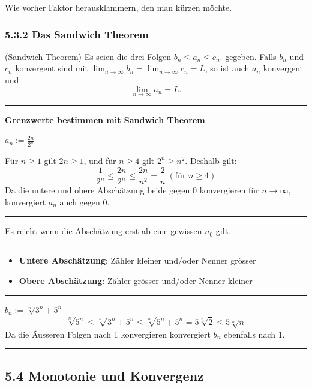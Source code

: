 \documentclass[a4paper,landscape,8pt]{extarticle}
\newcommand{\sep}{\vspace{5pt}\noindent\hrule\vspace{5pt}}
\begin{document}
\begin{multicols*}{4}
\Trick Wie vorher Faktor herausklammern, den man kürzen möchte.

\subsubsection{5.3.2 Das Sandwich Theorem}

\Satz (Sandwich Theorem) Es seien die drei Folgen $b_n \leq a_n \leq c_n$.
gegeben. Falls $b_n$ und $c_n$ konvergent sind mit $\lim_{n\to\infty} b_n =
\lim_{n\to\infty} c_n = L$, so ist auch $a_n$ konvergent und
\[
\lim_{n\to\infty} a_n = L.
\]

\begin{warmup}
\sep

\textbf{Grenzwerte bestimmen mit Sandwich Theorem}

\Bsp $a_n:= \frac{2n}{2^n}$

Für $n\geq 1$ gilt $2n \geq 1$, und für $n\geq 4$ gilt $2^n\geq n^2$. Deshalb
gilt:
\[
\frac{1}{2^n} \leq \frac{2n}{2^n} \leq \frac{2n}{n^2} = \frac{2}{n}  \
(\text{für }n\geq 4)
\]
Da die untere und obere Abschätzung beide gegen 0 konvergieren für $n\to\infty$,
konvergiert $a_n$ auch gegen 0.

\sep
\end{warmup}

\Trick Es reicht wenn die Abschätzung erst ab eine gewissen $n_0$ gilt.

\begin{warmup}
\sep
\end{warmup}

\Trick \begin{itemize}
  \item \textbf{Untere Abschätzung}: Zähler kleiner und/oder Nenner grösser
  \item \textbf{Obere Abschätzung}: Zähler grösser und/oder Nenner kleiner
\end{itemize}

\begin{warmup}
\sep

\Bsp $b_n:= \sqrt[n]{3^n+5^n}$
\[
\sqrt[n]{5^n} \leq \sqrt[n]{3^n+5^n} \leq \sqrt[n]{5^n+5^n} = 5\sqrt[n]{2} \leq
5 \sqrt[n]{n}
\]
Da die Äusseren Folgen nach 1 konvergieren konvergiert $b_n$ ebenfalls nach 1.

\sep
\end{warmup}

\subsection{5.4 Monotonie und Konvergenz}


\end{multicols*}
\end{document}
